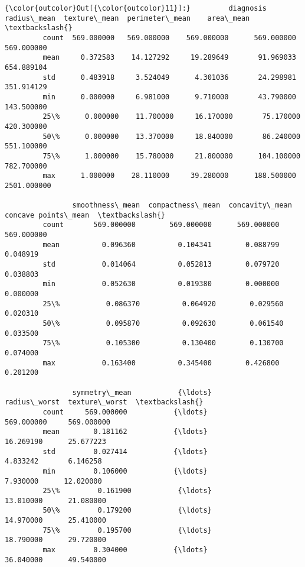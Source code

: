\documentclass[11pt]{article}
\begin{document}
\begin{Verbatim}[commandchars=\\\{\}]
{\color{outcolor}Out[{\color{outcolor}11}]:}         diagnosis  radius\_mean  texture\_mean  perimeter\_mean    area\_mean  \textbackslash{}
         count  569.000000   569.000000    569.000000      569.000000   569.000000   
         mean     0.372583    14.127292     19.289649       91.969033   654.889104   
         std      0.483918     3.524049      4.301036       24.298981   351.914129   
         min      0.000000     6.981000      9.710000       43.790000   143.500000   
         25\%      0.000000    11.700000     16.170000       75.170000   420.300000   
         50\%      0.000000    13.370000     18.840000       86.240000   551.100000   
         75\%      1.000000    15.780000     21.800000      104.100000   782.700000   
         max      1.000000    28.110000     39.280000      188.500000  2501.000000   
         
                smoothness\_mean  compactness\_mean  concavity\_mean  concave points\_mean  \textbackslash{}
         count       569.000000        569.000000      569.000000           569.000000   
         mean          0.096360          0.104341        0.088799             0.048919   
         std           0.014064          0.052813        0.079720             0.038803   
         min           0.052630          0.019380        0.000000             0.000000   
         25\%           0.086370          0.064920        0.029560             0.020310   
         50\%           0.095870          0.092630        0.061540             0.033500   
         75\%           0.105300          0.130400        0.130700             0.074000   
         max           0.163400          0.345400        0.426800             0.201200   
         
                symmetry\_mean           {\ldots}             radius\_worst  texture\_worst  \textbackslash{}
         count     569.000000           {\ldots}               569.000000     569.000000   
         mean        0.181162           {\ldots}                16.269190      25.677223   
         std         0.027414           {\ldots}                 4.833242       6.146258   
         min         0.106000           {\ldots}                 7.930000      12.020000   
         25\%         0.161900           {\ldots}                13.010000      21.080000   
         50\%         0.179200           {\ldots}                14.970000      25.410000   
         75\%         0.195700           {\ldots}                18.790000      29.720000   
         max         0.304000           {\ldots}                36.040000      49.540000   
         

\end{Verbatim}
\end{document}
